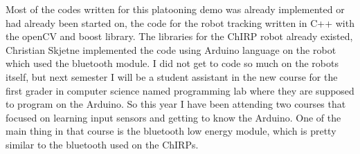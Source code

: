Most of the codes written for this platooning demo was already implemented or had already been started on, the code for the robot tracking written in C++ with the openCV and boost library. The libraries for the ChIRP robot already existed, Christian Skjetne implemented the code using Arduino language on the robot which used the bluetooth module. 
I did not get to code so much on the robots itself, but next semester I will be a student assistant in the new course for the first grader in computer science named programming lab where they are supposed to program on the Arduino. So this year I have been attending two courses that focused on learning input sensors and getting to know the Arduino. One of the main thing in that course is the bluetooth low energy module, which is pretty similar to the bluetooth used on the ChIRPs. 
